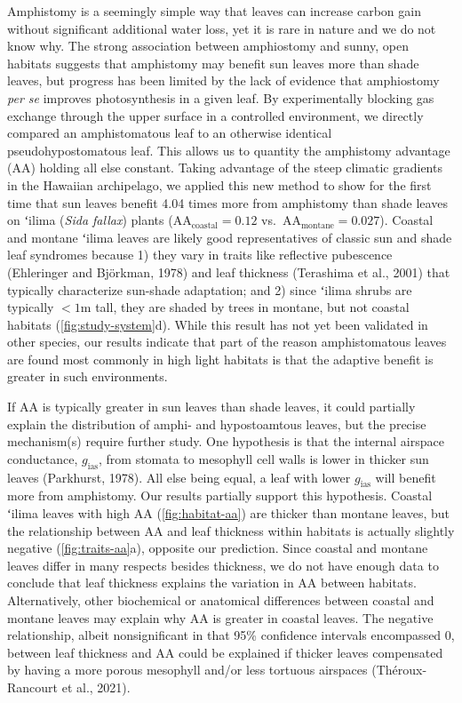 \documentclass[
  letterpaper,
  DIV=11,
  numbers=noendperiod]{scrartcl}
\begin{document}
Amphistomy is a seemingly simple way that leaves can increase carbon
gain without significant additional water loss, yet it is rare in nature
and we do not know why. The strong association between amphiostomy and
sunny, open habitats suggests that amphistomy may benefit sun leaves
more than shade leaves, but progress has been limited by the lack of
evidence that amphiostomy \emph{per se} improves photosynthesis in a
given leaf. By experimentally blocking gas exchange through the upper
surface in a controlled environment, we directly compared an
amphistomatous leaf to an otherwise identical pseudohypostomatous leaf.
This allows us to quantity the amphistomy advantage (\(\mathrm{AA}\))
holding all else constant. Taking advantage of the steep climatic
gradients in the Hawaiian archipelago, we applied this new method to
show for the first time that sun leaves benefit 4.04 times more from
amphistomy than shade leaves on ʻilima (\emph{Sida fallax}) plants
(\(\mathrm{AA}_\text{coastal} = 0.12\)
vs.~\(\mathrm{AA}_\text{montane} = 0.027\)). Coastal and montane ʻilima
leaves are likely good representatives of classic sun and shade leaf
syndromes because 1) they vary in traits like reflective pubescence
(Ehleringer and Björkman, 1978) and leaf thickness (Terashima et al.,
2001) that typically characterize sun-shade adaptation; and 2) since
ʻilima shrubs are typically \(<1\)m tall, they are shaded by trees in
montane, but not coastal habitats (\autoref{fig:study-system}d). While
this result has not yet been validated in other species, our results
indicate that part of the reason amphistomatous leaves are found most
commonly in high light habitats is that the adaptive benefit is greater
in such environments.

If \(\mathrm{AA}\) is typically greater in sun leaves than shade leaves,
it could partially explain the distribution of amphi- and hypostoamtous
leaves, but the precise mechanism(s) require further study. One
hypothesis is that the internal airspace conductance,
\(g_\mathrm{ias}\), from stomata to mesophyll cell walls is lower in
thicker sun leaves (Parkhurst, 1978). All else being equal, a leaf with
lower \(g_\mathrm{ias}\) will benefit more from amphistomy. Our results
partially support this hypothesis. Coastal ʻilima leaves with high
\(\mathrm{AA}\) (\autoref{fig:habitat-aa}) are thicker than montane
leaves, but the relationship between \(\mathrm{AA}\) and leaf thickness
within habitats is actually slightly negative
(\autoref{fig:traits-aa}a), opposite our prediction. Since coastal and
montane leaves differ in many respects besides thickness, we do not have
enough data to conclude that leaf thickness explains the variation in
\(\mathrm{AA}\) between habitats. Alternatively, other biochemical or
anatomical differences between coastal and montane leaves may explain
why \(\mathrm{AA}\) is greater in coastal leaves. The negative
relationship, albeit nonsignificant in that 95\% confidence intervals
encompassed 0, between leaf thickness and \(\mathrm{AA}\) could be
explained if thicker leaves compensated by having a more porous
mesophyll and/or less tortuous airspaces (Théroux-Rancourt et al.,
2021).
\end{document}
